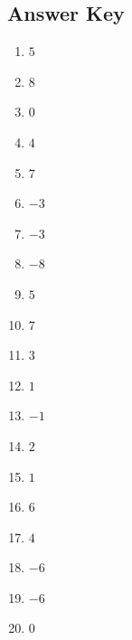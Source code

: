 \documentclass{article}
\begin{document}
\newpage

\subsection*{Answer Key}

\begin{enumerate}
\item $\displaystyle 5 $ \ 
\item $\displaystyle 8 $ \ 
\item $\displaystyle 0 $ \ 
\item $\displaystyle 4 $ \ 
\item $\displaystyle 7 $ \ 
\item $\displaystyle -3 $ \ 
\item $\displaystyle -3 $ \ 
\item $\displaystyle -8 $ \ 
\item $\displaystyle 5 $ \ 
\item $\displaystyle 7 $ \ 
\item $\displaystyle 3 $ \ 
\item $\displaystyle 1 $ \ 
\item $\displaystyle -1 $ \ 
\item $\displaystyle 2 $ \ 
\item $\displaystyle 1 $ \ 
\item $\displaystyle 6 $ \ 
\item $\displaystyle 4 $ \ 
\item $\displaystyle -6 $ \ 
\item $\displaystyle -6 $ \ 
\item $\displaystyle 0 $ \ 

\end{enumerate}
\end{document}
